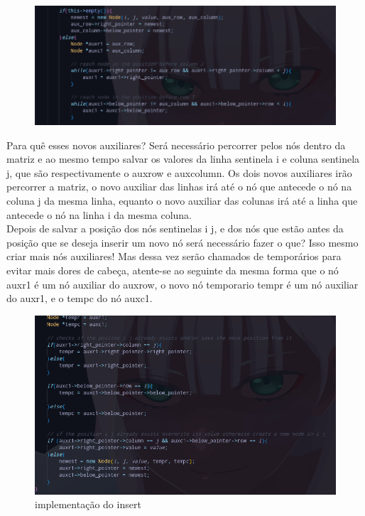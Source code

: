 \documentclass[a4paper,12pt]{article}
\begin{document}
\begin{figure}[H]
\centering
\includegraphics[width=1\textwidth]{Imagens/sparsematrixCPP/sparsematrix-insert-pt2.png}
\caption{\label{fig:insert}}
\end{figure}

Para quê esses novos auxiliares? Será necessário percorrer pelos nós dentro da matriz e ao mesmo tempo salvar os valores da linha sentinela i e coluna sentinela j, que são respectivamente o auxrow e auxcolumn. Os dois novos auxiliares irão percorrer a matriz, o novo auxiliar das linhas irá até o nó que antecede o nó na coluna j da mesma linha, equanto o novo auxiliar das colunas irá até a linha que antecede o nó na linha i da mesma coluna.\\
Depois de salvar a posição dos nós sentinelas i j, e dos nós que estão antes da posição que se deseja inserir um novo nó será necessário fazer o que? Isso mesmo criar mais nós auxiliares! Mas dessa vez serão chamados de temporários para evitar mais dores de cabeça, atente-se ao seguinte da mesma forma que o nó auxr1 é um nó auxiliar do auxrow, o novo nó temporario tempr é um nó auxiliar do auxr1, e o tempc do nó auxc1.

\begin{figure}[H]
\centering
\includegraphics[width=1\textwidth]{Imagens/sparsematrixCPP/sparsematrix-insert-pt3.png}
\caption{\label{fig:insert} implementação do insert}
\end{figure}
\end{document}
